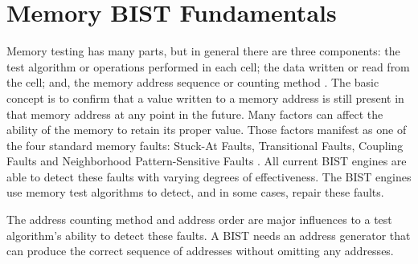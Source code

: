 \chapter{Memory BIST Fundamentals}
\label{chap:background}
Memory testing has many parts, but in general there are three components: the test algorithm or operations performed in each cell; the data written or read from the cell; and, the memory address sequence or counting method \cite{5993815}.  The basic concept is to confirm that a value written to a memory address is still present in that memory address at any point in the future.  Many factors can affect the ability of the memory to retain its proper value.  Those factors manifest as one of the four standard memory faults: Stuck-At Faults, Transitional Faults, Coupling Faults and Neighborhood Pattern-Sensitive Faults \cite{VanDeGoor1991}. All current BIST engines are able to detect these faults with varying degrees of effectiveness.  The BIST engines use memory test algorithms to detect, and in some cases, repair these faults.    

The address counting method and address order are major influences to a test algorithm's ability to detect these faults.   A BIST needs an address generator that can produce the correct sequence of addresses without omitting any addresses.  







